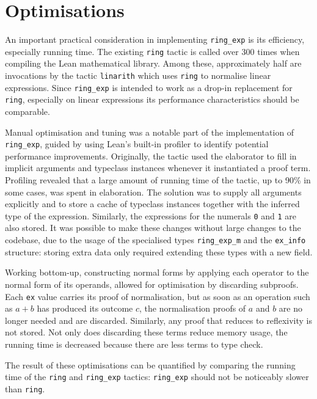 \documentclass{llncs}
\newcommand{\lean}[1]{\texttt{#1}\xspace} %
\newcommand{\ringexp}{\lean{ring\_exp}}
\begin{document}

\section{Optimisations}

An important practical consideration in implementing \ringexp is its efficiency, especially running time.
The existing \lean{ring} tactic is called over 300 times when compiling the Lean mathematical library.
Among these, approximately half are invocations by the tactic \lean{linarith} which uses \lean{ring} to normalise linear expressions.
Since \ringexp is intended to work as a drop-in replacement for \lean{ring},
especially on linear expressions its performance characteristics should be comparable.

Manual optimisation and tuning was a notable part of the implementation of \ringexp,
guided by using Lean's built-in profiler to identify potential performance improvements.
Originally, the tactic used the elaborator to fill in implicit arguments and typeclass instances
whenever it instantiated a proof term.
Profiling revealed that a large amount of running time of the tactic, up to 90\% in some cases,
was spent in elaboration.
The solution was to supply all arguments explicitly
and to store a cache of typeclass instances together with the inferred type of the expression.
Similarly, the expressions for the numerals \lean{0} and \lean{1} are also stored.
It was possible to make these changes without large changes to the codebase,
due to the usage of the specialised types \lean{ring\_exp\_m} and the \lean{ex\_info} structure:
storing extra data only required extending these types with a new field.

Working bottom-up, constructing normal forms by applying each operator to the normal form of its operands,
allowed for optimisation by discarding subproofs.
Each \lean{ex} value carries its proof of normalisation,
but as soon as an operation such as $a + b$ has produced its outcome $c$,
the normalisation proofs of $a$ and $b$ are no longer needed and are discarded.
Similarly, any proof that reduces to reflexivity is not stored.
Not only does discarding these terms reduce memory usage,
the running time is decreased because there are less terms to type check.

The result of these optimisations can be quantified by comparing the running time
of the \lean{ring} and \ringexp tactics: \ringexp should not be noticeably slower than \lean{ring}.
\end{document}
